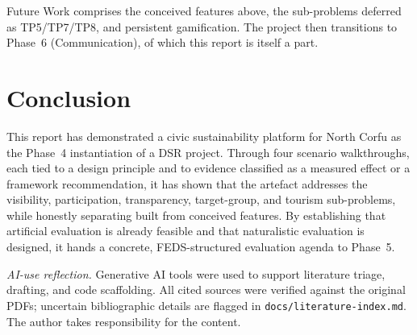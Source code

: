 \documentclass[11pt,a4paper]{article}
\begin{document}
Future Work comprises the conceived features above, the sub-problems deferred as TP5/TP7/TP8, and persistent gamification. The project then transitions to Phase~6 (Communication), of which this report is itself a part.

\section{Conclusion}

This report has demonstrated a civic sustainability platform for North Corfu as the Phase~4 instantiation of a DSR project. Through four scenario walkthroughs, each tied to a design principle and to evidence classified as a measured effect or a framework recommendation, it has shown that the artefact addresses the visibility, participation, transparency, target-group, and tourism sub-problems, while honestly separating built from conceived features. By establishing that artificial evaluation is already feasible and that naturalistic evaluation is designed, it hands a concrete, FEDS-structured evaluation agenda to Phase~5.

\vspace{0.5em}
\small\emph{AI-use reflection.} Generative AI tools were used to support literature triage, drafting, and code scaffolding. All cited sources were verified against the original PDFs; uncertain bibliographic details are flagged in \texttt{docs/literature-index.md}. The author takes responsibility for the content.

\newpage
\end{document}
